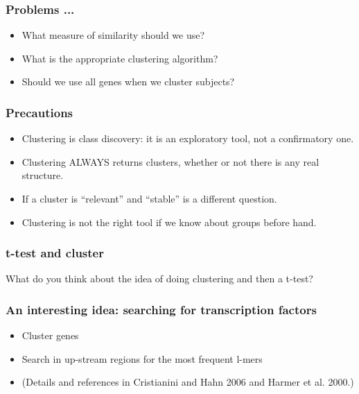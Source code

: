 






\begin{frame}
\frametitle{Problems ...}
\begin{itemize}
\item What measure of similarity should we use?
\item What is the appropriate clustering algorithm?
\item Should we use all genes when we cluster subjects?
\end{itemize}
\end{frame}



\begin{frame}
\frametitle{Precautions}
\begin{itemize}
\item Clustering is class discovery: it is an exploratory tool, not a
  confirmatory one.
  
\item Clustering ALWAYS returns clusters, whether or not there is any real
  structure. 
\item If a cluster is ``relevant'' and ``stable'' is a different question.
\item Clustering is not the right tool if we know about groups before hand.
\end{itemize}
\end{frame}


\begin{frame}
\frametitle{t-test and cluster}
What do you think about the idea of doing clustering and then a t-test?
\end{frame}


\begin{frame}
\frametitle{An interesting idea: searching for transcription factors}
\begin{itemize}
\item Cluster genes
\item Search in up-stream regions for the most frequent l-mers

\item (Details and references in Cristianini and Hahn 2006 and Harmer et
  al. 2000.)
\end{itemize}
\end{frame}


